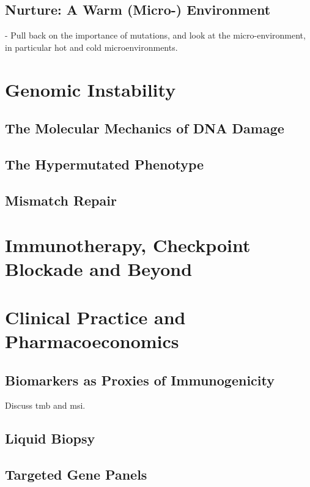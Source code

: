 \documentclass[10pt,twoside,openright]{report}
\begin{document}
\subsection{Nurture: A Warm (Micro-) Environment}
- Pull back on the importance of mutations, and look at the micro-environment, in particular hot and cold microenvironments. \citep{keenan_genomic_2019} \citep{boulter_fibrotic_2020}



\section{Genomic Instability}
\subsection{The Molecular Mechanics of DNA Damage}
\subsection{The Hypermutated Phenotype}
\subsection{Mismatch Repair}
\section{Immunotherapy, Checkpoint Blockade and Beyond}


\section{Clinical Practice and Pharmacoeconomics}
\subsection{Biomarkers as Proxies of Immunogenicity}
Discuss \acrshort{tmb} and \acrshort{msi}.

\subsection{Liquid Biopsy}
\citep{jensen_association_2020} \citep{genovese_clonal_2014} \citep{razavi_high-intensity_2019} \citep{schweizer_clinical_2019} \citep{annala_circulating_2018} \citep{goodall_circulating_2017}
\subsection{Targeted Gene Panels}
\end{document}

